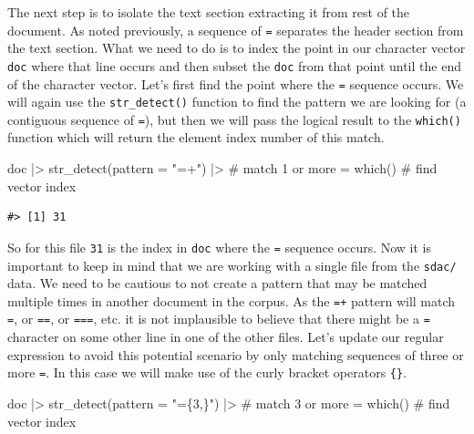 \documentclass[
  letterpaper,
]{latex/krantz}
\newenvironment{Shaded}{\begin{snugshade}}{\end{snugshade}}
\newcommand{\AttributeTok}[1]{\textcolor[rgb]{0.40,0.45,0.13}{#1}}
\newcommand{\CommentTok}[1]{\textcolor[rgb]{0.37,0.37,0.37}{#1}}
\newcommand{\FunctionTok}[1]{\textcolor[rgb]{0.28,0.35,0.67}{#1}}
\newcommand{\NormalTok}[1]{\textcolor[rgb]{0.00,0.23,0.31}{#1}}
\newcommand{\SpecialCharTok}[1]{\textcolor[rgb]{0.37,0.37,0.37}{#1}}
\newcommand{\StringTok}[1]{\textcolor[rgb]{0.13,0.47,0.30}{#1}}
\begin{document}
The next step is to isolate the text section extracting it from rest of
the document. As noted previously, a sequence of \texttt{=} separates
the header section from the text section. What we need to do is to index
the point in our character vector \texttt{doc} where that line occurs
and then subset the \texttt{doc} from that point until the end of the
character vector. Let's first find the point where the \texttt{=}
sequence occurs. We will again use the \texttt{str\_detect()} function
to find the pattern we are looking for (a contiguous sequence of
\texttt{=}), but then we will pass the logical result to the
\texttt{which()} function which will return the element index number of
this match.

\begin{Shaded}
\begin{Highlighting}[]
\NormalTok{doc }\SpecialCharTok{|\textgreater{}} 
  \FunctionTok{str\_detect}\NormalTok{(}\AttributeTok{pattern =} \StringTok{"=+"}\NormalTok{) }\SpecialCharTok{|\textgreater{}} \CommentTok{\# match 1 or more \textasciigrave{}=\textasciigrave{}}
  \FunctionTok{which}\NormalTok{() }\CommentTok{\# find vector index}
\end{Highlighting}
\end{Shaded}

\begin{verbatim}
#> [1] 31
\end{verbatim}

So for this file \texttt{31} is the index in \texttt{doc} where the
\texttt{=} sequence occurs. Now it is important to keep in mind that we
are working with a single file from the \texttt{sdac/} data. We need to
be cautious to not create a pattern that may be matched multiple times
in another document in the corpus. As the \texttt{=+} pattern will match
\texttt{=}, or \texttt{==}, or \texttt{===}, etc. it is not implausible
to believe that there might be a \texttt{=} character on some other line
in one of the other files. Let's update our regular expression to avoid
this potential scenario by only matching sequences of three or more
\texttt{=}. In this case we will make use of the curly bracket operators
\texttt{\{\}}.

\begin{Shaded}
\begin{Highlighting}[]
\NormalTok{doc }\SpecialCharTok{|\textgreater{}} 
  \FunctionTok{str\_detect}\NormalTok{(}\AttributeTok{pattern =} \StringTok{"=\{3,\}"}\NormalTok{) }\SpecialCharTok{|\textgreater{}} \CommentTok{\# match 3 or more \textasciigrave{}=\textasciigrave{}}
  \FunctionTok{which}\NormalTok{() }\CommentTok{\# find vector index}
\end{Highlighting}
\end{Shaded}
\end{document}

